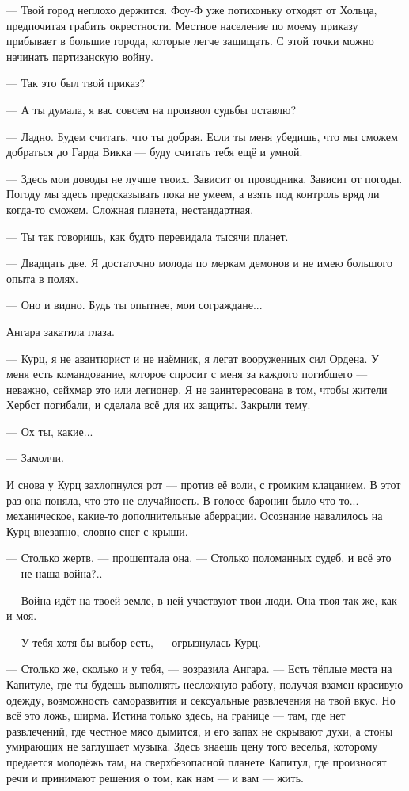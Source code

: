 --- Твой город неплохо держится.
Фоу-Ф уже потихоньку отходят от Хольца, предпочитая грабить окрестности.
Местное население по моему приказу прибывает в большие города, которые легче защищать.
С этой точки можно начинать партизанскую войну.

--- Так это был твой приказ?

--- А ты думала, я вас совсем на произвол судьбы оставлю?

--- Ладно.
Будем считать, что ты добрая.
Если ты меня убедишь, что мы сможем добраться до Гарда Викка --- буду считать тебя ещё и умной.

--- Здесь мои доводы не лучше твоих.
Зависит от проводника.
Зависит от погоды.
Погоду мы здесь предсказывать пока не умеем, а взять под контроль вряд ли когда-то сможем.
Сложная планета, нестандартная.

--- Ты так говоришь, как будто перевидала тысячи планет.

--- Двадцать две.
Я достаточно молода по меркам демонов и не имею большого опыта в полях.

--- Оно и видно.
Будь ты опытнее, мои сограждане...

Ангара закатила глаза.

--- Курц, я не авантюрист и не наёмник, я легат вооруженных сил Ордена.
У меня есть командование, которое спросит с меня за каждого погибшего --- неважно, сейхмар это или легионер.
Я не заинтересована в том, чтобы жители Хербст погибали, и сделала всё для их защиты.
Закрыли тему.

--- Ох ты, какие...

--- Замолчи.

И снова у Курц захлопнулся рот --- против её воли, с громким клацанием.
В этот раз она поняла, что это не случайность.
В голосе баронин было что-то... механическое, какие-то дополнительные аберрации.
Осознание навалилось на Курц внезапно, словно снег с крыши.

--- Столько жертв, --- прошептала она.
--- Столько поломанных судеб, и всё это --- не наша война?..

--- Война идёт на твоей земле, в ней участвуют твои люди.
Она твоя так же, как и моя.

--- У тебя хотя бы выбор есть, --- огрызнулась Курц.

--- Столько же, сколько и у тебя, --- возразила Ангара.
--- Есть тёплые места на Капитуле, где ты будешь выполнять несложную работу, получая взамен красивую одежду, возможность саморазвития и сексуальные развлечения на твой вкус.
Но всё это ложь, ширма.
Истина только здесь, на границе --- там, где нет развлечений, где честное мясо дымится, и его запах не скрывают духи, а стоны умирающих не заглушает музыка.
Здесь знаешь цену того веселья, которому предается молодёжь там, на сверхбезопасной планете Капитул, где произносят речи и принимают решения о том, как нам --- и вам --- жить.

